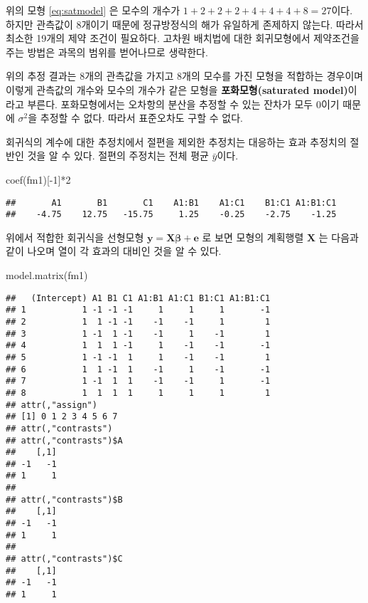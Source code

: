 \documentclass[
]{book}
\newenvironment{Shaded}{\begin{snugshade}}{\end{snugshade}}
\newcommand{\DecValTok}[1]{\textcolor[rgb]{0.00,0.00,0.81}{#1}}
\newcommand{\FunctionTok}[1]{\textcolor[rgb]{0.00,0.00,0.00}{#1}}
\newcommand{\NormalTok}[1]{#1}
\newcommand{\SpecialCharTok}[1]{\textcolor[rgb]{0.00,0.00,0.00}{#1}}
\newcommand{\bm}[1]{\boldsymbol{\mathbf{#1}}}
\begin{document}
위의 모형 \eqref{eq:satmodel} 은 모수의 개수가 \(1+2+2+2+4+4+4+8=27\)이다. 하지만 관측값이 8개이기 때문에 정규방정식의 해가 유일하게 존제하지 않는다. 따라서 최소한 19개의 제약 조건이 필요하다. 고차원 배치법에 대한 회귀모형에서 제약조건을 주는 방법은 과목의 범위를 벋어나므로 생략한다.

위의 추정 결과는 8개의 관측값을 가지고 8개의 모수를 가진 모형을 적합하는 경우이며 이렇게 관측값의 개수와 모수의 개수가 같은 모형을 \textbf{포화모형(saturated model)}이라고 부른다. 포화모형에서는 오차항의 분산을 추정할 수 있는 잔차가 모두 0이기 때문에 \(\sigma^2\)을 추정할 수 없다. 따라서 표준오차도 구할 수 없다.

회귀식의 계수에 대한 추정치에서 절편을 제외한 추정치는 대응하는 효과 추정치의 절반인 것을 알 수 있다.
절편의 주정치는 전체 평균 \(\bar y\)이다.

\begin{Shaded}
\begin{Highlighting}[]
\FunctionTok{coef}\NormalTok{(fm1)[}\SpecialCharTok{{-}}\DecValTok{1}\NormalTok{]}\SpecialCharTok{*}\DecValTok{2}
\end{Highlighting}
\end{Shaded}

\begin{verbatim}
##       A1       B1       C1    A1:B1    A1:C1    B1:C1 A1:B1:C1 
##    -4.75    12.75   -15.75     1.25    -0.25    -2.75    -1.25
\end{verbatim}

위에서 적합한 회귀식을 선형모형 \(\bm y = \bm X \bm \beta + \bm e\) 로 보면 모형의 계획행렬 \(\bm X\) 는 다음과 같이 나오며 열이 각 효과의 대비인 것을 알 수 있다.

\begin{Shaded}
\begin{Highlighting}[]
\FunctionTok{model.matrix}\NormalTok{(fm1)}
\end{Highlighting}
\end{Shaded}

\begin{verbatim}
##   (Intercept) A1 B1 C1 A1:B1 A1:C1 B1:C1 A1:B1:C1
## 1           1 -1 -1 -1     1     1     1       -1
## 2           1  1 -1 -1    -1    -1     1        1
## 3           1 -1  1 -1    -1     1    -1        1
## 4           1  1  1 -1     1    -1    -1       -1
## 5           1 -1 -1  1     1    -1    -1        1
## 6           1  1 -1  1    -1     1    -1       -1
## 7           1 -1  1  1    -1    -1     1       -1
## 8           1  1  1  1     1     1     1        1
## attr(,"assign")
## [1] 0 1 2 3 4 5 6 7
## attr(,"contrasts")
## attr(,"contrasts")$A
##    [,1]
## -1   -1
## 1     1
## 
## attr(,"contrasts")$B
##    [,1]
## -1   -1
## 1     1
## 
## attr(,"contrasts")$C
##    [,1]
## -1   -1
## 1     1
\end{verbatim}
\end{document}
